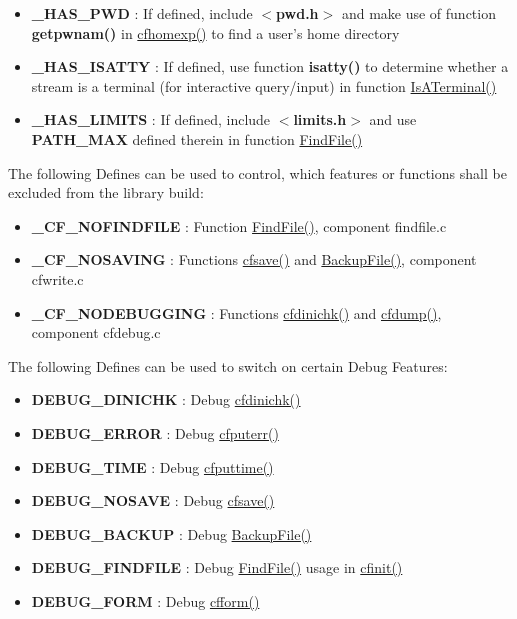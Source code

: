 \begin{itemize}
\item {\bf \_\-HAS\_\-PWD} : If defined, include {\bf $<$pwd.h$>$} and make use of function {\bf getpwnam()} in \hyperlink{group__advanced__features_gb6f874ac347d273dc45ad011808fe703}{cfhomexp()} to find a user's home directory\item {\bf \_\-HAS\_\-ISATTY} : If defined, use function {\bf isatty()} to determine whether a stream is a terminal (for interactive query/input) in function \hyperlink{group__utilities_g9a90e738d03b642f33901600671d225a}{IsATerminal()}\item {\bf \_\-HAS\_\-LIMITS} : If defined, include {\bf $<$limits.h$>$} and use {\bf PATH\_\-MAX} defined therein in function \hyperlink{group__utilities_g4e4e8f9a03b7f3598b5efd199b9a67c9}{FindFile()}\end{itemize}


The following Defines can be used to control, which features or functions shall be excluded from the library build:

\begin{itemize}
\item {\bf \_\-CF\_\-NOFINDFILE} : Function \hyperlink{group__utilities_g4e4e8f9a03b7f3598b5efd199b9a67c9}{FindFile()}, component findfile.c\item {\bf \_\-CF\_\-NOSAVING} : Functions \hyperlink{group__setting__saving_g046d8a68eae35b987eacca04a9a06cca}{cfsave()} and \hyperlink{group__utilities_g0fccda7427db33b2f73a3b6dca864207}{BackupFile()}, component cfwrite.c\item {\bf \_\-CF\_\-NODEBUGGING} : Functions \hyperlink{group__advanced__features_g35e2c28f591ac71e3617c612233ecdd0}{cfdinichk()} and \hyperlink{group__advanced__features_gecfc8ee37366e1b36cb5aac0cc41ebdc}{cfdump()}, component cfdebug.c\end{itemize}


The following Defines can be used to switch on certain Debug Features:

\begin{itemize}
\item {\bf DEBUG\_\-DINICHK} : Debug \hyperlink{group__advanced__features_g35e2c28f591ac71e3617c612233ecdd0}{cfdinichk()}\item {\bf DEBUG\_\-ERROR} : Debug \hyperlink{group__errors_gad2687826308f21b54657d2728e4cfcc}{cfputerr()}\item {\bf DEBUG\_\-TIME} : Debug \hyperlink{group__setting__saving_g6f133f88dc253a6a80d13eed4d123063}{cfputtime()}\item {\bf DEBUG\_\-NOSAVE} : Debug \hyperlink{group__setting__saving_g046d8a68eae35b987eacca04a9a06cca}{cfsave()}\item {\bf DEBUG\_\-BACKUP} : Debug \hyperlink{group__utilities_g0fccda7427db33b2f73a3b6dca864207}{BackupFile()}\item {\bf DEBUG\_\-FINDFILE} : Debug \hyperlink{group__utilities_g4e4e8f9a03b7f3598b5efd199b9a67c9}{FindFile()} usage in \hyperlink{group__cflib__core_ge593ff607f853bd5fc16a16bb6759314}{cfinit()}\item {\bf DEBUG\_\-FORM} : Debug \hyperlink{group__report__generation_g2f8350e7d032c87b2a0e1cb6149a85ec}{cfform()}\end{itemize}


